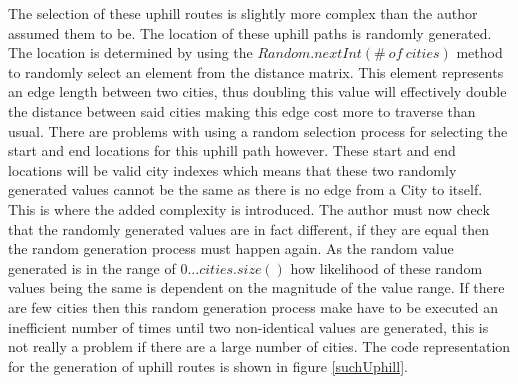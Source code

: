 The selection of these uphill routes is slightly more complex than the author assumed them to be. The location of these uphill paths is randomly generated. The location is determined by using the $Random.nextInt(\#\ of\ cities)$ method to randomly select an element from the distance matrix. This element represents an edge length between two cities, thus doubling this value will effectively double the distance between said cities making this edge cost more to traverse than usual. There are problems with using a random selection process for selecting the start and end locations for this uphill path however. These start and end locations will be valid city indexes which means that these two randomly generated values cannot be the same as there is no edge from a City to itself. This is where the added complexity is introduced. The author must now check that the randomly generated values are in fact different, if they are equal then the random generation process must happen again. As the random value generated is in the range of $0...cities.size()$ how likelihood of these random values being the same is dependent on the magnitude of the value range. If there are few cities then this random generation process make have to be executed an inefficient number of times until two non-identical values are generated, this is not really a problem if there are a large number of cities. The code representation for the generation of uphill routes is shown in figure \ref{suchUphill}.

